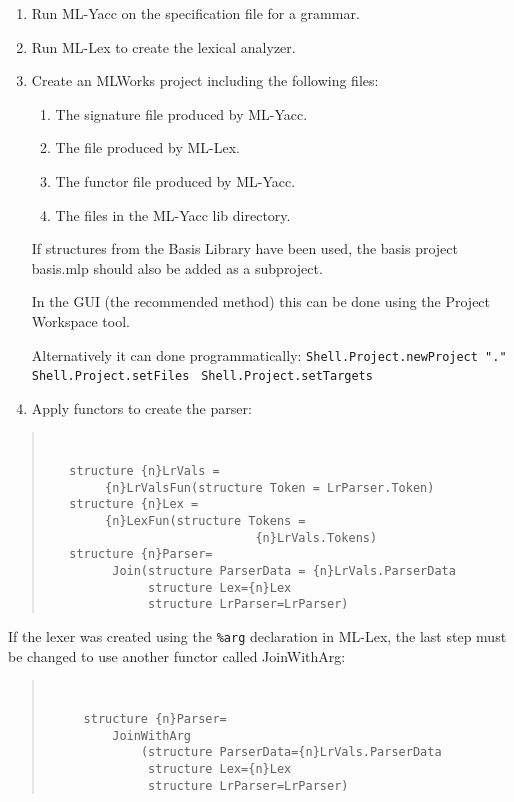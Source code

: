\documentclass{article}
\begin{document}
\begin{enumerate}

\item Run ML-Yacc on the specification file for a grammar.
\item Run ML-Lex to create the lexical analyzer.

\item Create an MLWorks project including the following files: 
      \begin{enumerate}
      \item The signature file produced by ML-Yacc.
      \item The file produced by ML-Lex.
      \item The functor file produced by ML-Yacc.
      \item The files in the ML-Yacc lib directory.  
      \end{enumerate}
      If structures from the Basis Library have
      been used, the basis project basis.mlp should also be added
      as a subproject.

      In the GUI (the recommended method) this can be done using the 
      Project Workspace tool.

      Alternatively it can done programmatically: 
	{\verb+Shell.Project.newProject "."+}
	{\verb+Shell.Project.setFiles +}
	{\verb+Shell.Project.setTargets +}

\item Apply functors to create the parser:

\end{enumerate}
\begin{quote}
\tt
\begin{verbatim}
   structure {n}LrVals =
        {n}LrValsFun(structure Token = LrParser.Token)
   structure {n}Lex = 
        {n}LexFun(structure Tokens = 
                             {n}LrVals.Tokens)
   structure {n}Parser=
         Join(structure ParserData = {n}LrVals.ParserData
              structure Lex={n}Lex
              structure LrParser=LrParser)
\end{verbatim}
\end{quote}
If the lexer was created using the {\tt \%arg} declaration in ML-Lex,
the last step
must be changed to use another functor called JoinWithArg:
\begin{quote}
\tt
\begin{verbatim}
     structure {n}Parser=
         JoinWithArg
             (structure ParserData={n}LrVals.ParserData
              structure Lex={n}Lex
              structure LrParser=LrParser)
\end{verbatim}
\end{quote}
\end{document}

